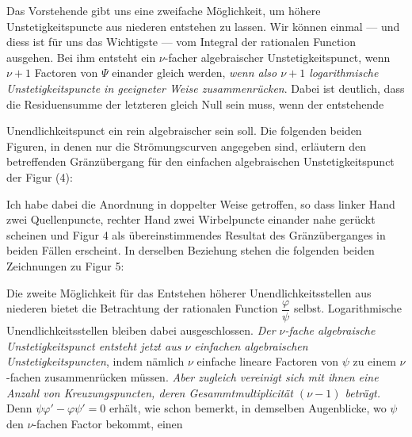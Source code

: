 \documentclass{article}
\begin{document}
Das Vorstehende gibt uns eine zweifache Möglichkeit, um höhere Unstetigkeitspuncte aus niederen entstehen zu lassen. Wir können einmal --- und diess ist für uns das Wichtigste --- vom Integral der rationalen Function ausgehen. Bei ihm entsteht ein $\nu$-facher algebraischer Unstetigkeitspunct, wenn $\nu + 1$ Factoren von $\Psi$ einander gleich werden, \emph{wenn also $\nu + 1$ logarithmische Unstetigkeitspuncte in geeigneter Weise zusammenrücken}. Dabei ist deutlich, dass die Residuensumme der letzteren gleich Null sein muss, wenn der entstehende

Unendlichkeitspunct ein rein algebraischer sein soll. Die folgenden beiden Figuren, in denen nur die Strömungscurven angegeben sind, erläutern den betreffenden Gränzübergang für den einfachen algebraischen Unstetigkeitspunct der Figur (4):


Ich habe dabei die Anordnung in doppelter Weise getroffen, so dass linker Hand zwei Quellenpuncte, rechter Hand zwei Wirbelpuncte einander nahe gerückt scheinen und Figur 4 als übereinstimmendes Resultat des Gränzüberganges in beiden Fällen erscheint. In derselben Beziehung stehen die folgenden beiden Zeichnungen zu Figur 5:


Die zweite Möglichkeit für das Entstehen höherer Unendlichkeitsstellen aus niederen bietet die Betrachtung der rationalen Function $\dfrac{\varphi}{\psi}$ selbst. Logarithmische Unendlichkeitsstellen bleiben dabei ausgeschlossen. \emph{Der $\nu$-fache algebraische Unstetigkeitspunct entsteht jetzt aus $\nu$ einfachen algebraischen Unstetigkeitspuncten}, indem nämlich $\nu$ einfache lineare Factoren von $\psi$ zu einem $\nu$-fachen zusammenrücken müssen. \emph{Aber zugleich vereinigt sich mit ihnen eine Anzahl von Kreuzungspuncten, deren Gesammtmultiplicität $(\nu - 1)$ beträgt.} Denn $\psi\varphi' - \varphi\psi' = 0$ erhält, wie schon bemerkt, in demselben Augenblicke, wo $\psi$ den $\nu$-fachen Factor bekommt, einen
\end{document}
